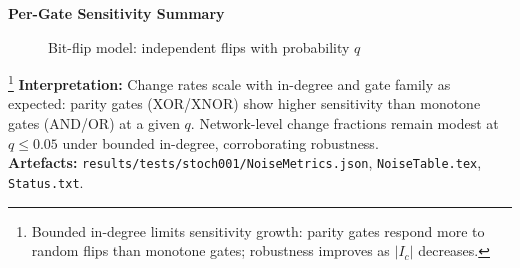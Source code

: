 \documentclass[11pt]{article}
\begin{document}
\textbf{Per-Gate Sensitivity Summary}
\begin{figure}[h]
\centering
{}
\caption{Bit-flip model: independent flips with probability $q$}
\end{figure}
\footnote{Bounded in-degree limits sensitivity growth: parity gates respond more to random flips than monotone gates; robustness improves as $\lvert I_c\rvert$ decreases.}
\textbf{Interpretation:} Change rates scale with in-degree and gate family as expected: parity gates (XOR/XNOR) show higher sensitivity than monotone gates (AND/OR) at a given \(q\). Network-level change fractions remain modest at \(q\le 0.05\) under bounded in-degree, corroborating robustness.\\
\textbf{Artefacts:} \texttt{results/tests/stoch001/NoiseMetrics.json}, \texttt{NoiseTable.tex}, \texttt{Status.txt}.
\end{document}
